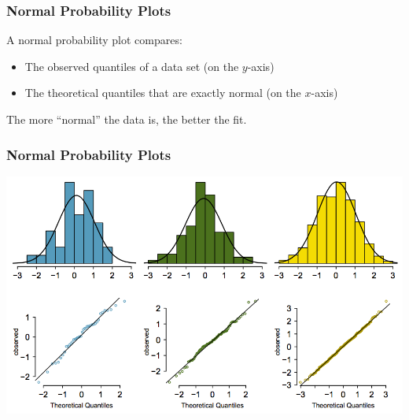 \documentclass[handout]{beamer}
\newcommand{\blue}[1]{\textcolor{blue2}{#1}}
\begin{document}
\begin{frame}
\frametitle{Normal Probability Plots}
A normal probability plot compares:

\begin{itemize}
\item The \blue{observed} quantiles of a data set (on the $y$-axis)
\item The \blue{theoretical} quantiles that are \blue{exactly} normal (on the $x$-axis)
\end{itemize}

\pause\vspace{0.5cm}

The more ``normal'' the data is, the better the fit.  

\end{frame}


\begin{frame}
\frametitle{Normal Probability Plots}
\begin{center}
\includegraphics[width=\textwidth]{figure/normal_hist2.png}
\end{center}
\end{frame}
\end{document}
